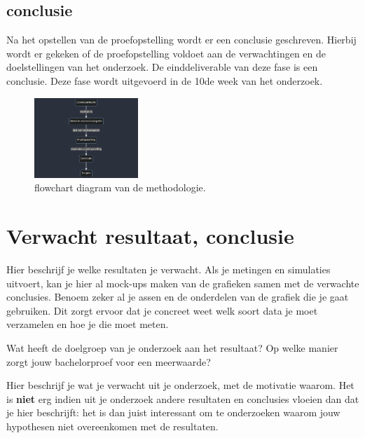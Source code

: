 \subsection{conclusie}%
\label{sub:conclusie_methodologie}
Na het opstellen van de proefopstelling wordt er een conclusie geschreven. Hierbij wordt er gekeken of de proefopstelling voldoet aan de verwachtingen en de doelstellingen van het onderzoek. De einddeliverable van deze fase is een conclusie. Deze fase wordt uitgevoerd in de 10de week van het onderzoek.


\begin{figure}[b]
  \centering
  \includegraphics[width=0.35\textwidth,height=0.35\textheight,keepaspectratio]{./graphics/mermaid-diagram.png}
  \caption{flowchart diagram van de methodologie.}
  \label{fig:flowchart}
\end{figure}

\newpage
\section{Verwacht resultaat, conclusie}%
\label{sec:verwachte_resultaten}

Hier beschrijf je welke resultaten je verwacht. Als je metingen en simulaties uitvoert, kan je hier al mock-ups maken van de grafieken samen met de verwachte conclusies. Benoem zeker al je assen en de onderdelen van de grafiek die je gaat gebruiken. Dit zorgt ervoor dat je concreet weet welk soort data je moet verzamelen en hoe je die moet meten.

Wat heeft de doelgroep van je onderzoek aan het resultaat? Op welke manier zorgt jouw bachelorproef voor een meerwaarde?

Hier beschrijf je wat je verwacht uit je onderzoek, met de motivatie waarom. Het is \textbf{niet} erg indien uit je onderzoek andere resultaten en conclusies vloeien dan dat je hier beschrijft: het is dan juist interessant om te onderzoeken waarom jouw hypothesen niet overeenkomen met de resultaten.

